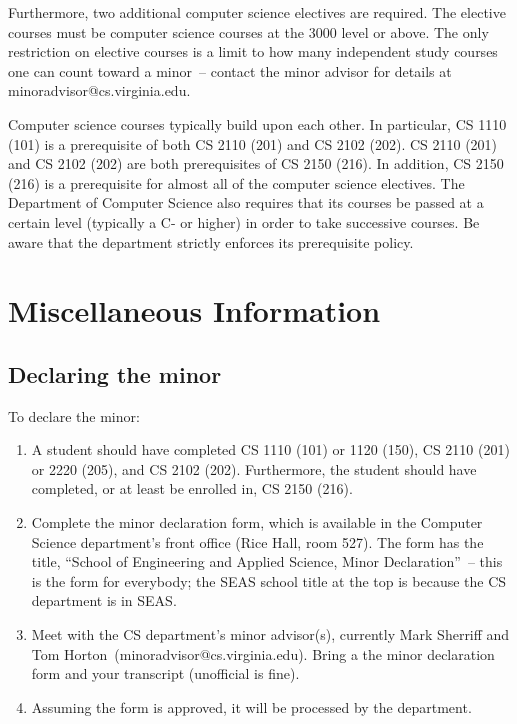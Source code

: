 \documentclass[10pt,letter]{book}
\makeatletter
\newenvironment{numlist}{
\begin{enumerate}
\setlength{\itemsep}{0pt}
\setlength{\parskip}{0pt}}
{\end{enumerate}}
\newcommand{\csminoradvisor}{Mark Sherriff and Tom Horton}
\newcommand{\csminoradvisoremail}{minoradvisor@cs.virginia.edu}
\newcommand{\mysection}[1]{\section{#1}\renewcommand{\rightmark}{#1}}
\makeatother
\begin{document}
Furthermore, two additional computer science electives are
required. The elective courses must be computer science courses at the
3000 level or above. The only restriction on elective courses is a
limit to how many independent study courses one can count toward a
minor~-- contact the minor advisor for details at
\csminoradvisoremail.

Computer science courses typically build upon each other. In
particular, CS 1110 (101) is a prerequisite of both CS 2110 (201) and
CS 2102 (202). CS 2110 (201) and CS 2102 (202) are both prerequisites
of CS 2150 (216). In addition, CS 2150 (216) is a prerequisite for
almost all of the computer science electives. The Department of
Computer Science also requires that its courses be passed at a certain
level (typically a C- or higher) in order to take successive
courses. Be aware that the department strictly enforces its
prerequisite policy.

 
\mysection{Miscellaneous Information}
\subsection{Declaring the minor}

To declare the minor:

\begin{numlist}

\item A student should have completed CS 1110 (101) or 1120 (150), CS
  2110 (201) or 2220 (205), and CS 2102 (202). Furthermore, the
  student should have completed, or at least be enrolled in, CS 2150
  (216).

\item Complete the minor declaration form, which is available in the
  Computer Science department's front office (Rice Hall, room 527).
  The form has the title, ``School of Engineering and Applied Science,
  Minor Declaration''~-- this is the form for everybody; the SEAS
  school title at the top is because the CS department is in SEAS.

\item Meet with the CS department's minor advisor(s), currently
  \csminoradvisor\ (\csminoradvisoremail).  Bring a the minor
  declaration form and your transcript (unofficial is fine).

\item Assuming the form is approved, it will be processed by the
  department.

\end{numlist}
\end{document}

